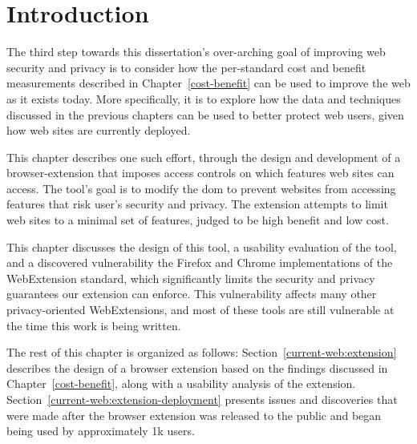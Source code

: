 \section{Introduction}
\label{current-web:current-web}

The third step towards this dissertation's over-arching goal of improving web
security and privacy is to consider how the per-standard cost and benefit
measurements described in Chapter~\ref{cost-benefit} can be used to improve the
web as it exists today.  More specifically, it is to explore how the data and
techniques discussed in the previous chapters can be used to better protect web
users, given how web sites are currently deployed.

This chapter describes one such effort, through the design and development
of a browser-extension that imposes access controls on which \WAPI features
web sites can access.  The tool's goal is to modify the \gls{dom} to prevent
websites from accessing features that risk user's security and privacy. The
extension attempts to limit web sites to a minimal set of features, judged to
be high benefit and low cost.

This chapter discusses the design of this tool, a usability evaluation
of the tool, and a discovered vulnerability the Firefox and Chrome
implementations of the WebExtension standard, which significantly limits the
security and privacy guarantees our extension can enforce.  This
vulnerability affects many other privacy-oriented WebExtensions, and most
of these tools are still vulnerable at the time this work is being written.

The rest of this chapter is organized as follows:
Section~\ref{current-web:extension} describes the design of a browser extension
based on the findings discussed in Chapter~\ref{cost-benefit},
along with a usability analysis of the extension.
Section~\ref{current-web:extension-deployment} presents issues and discoveries
that were made after the browser extension was released to the public and
began being used by approximately 1k users.
